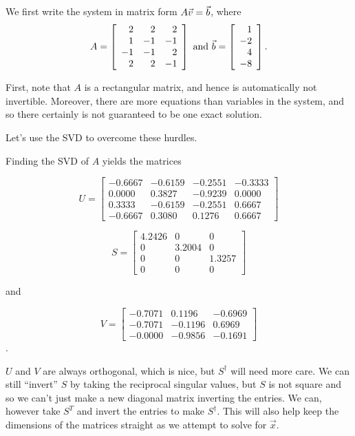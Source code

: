 \documentclass{ximera}
\begin{document}
\begin{solution}
  We first write the system in matrix form $A\vect{v}=\vect{b}$, where
  \begin{equation*}
    A = \startmat{rrr}
      2 & 2 & 2 \\
      1 & -1 & -1 \\
      -1 & -1 & 2 \\
      2 & 2 & -1 \\
    \stopmat
    \quad\mbox{and}\quad
    \vect{b} = \startmat{r} 1 \\ -2 \\ 4 \\ -8 \stopmat.
  \end{equation*}


First, note that $A$ is a rectangular matrix, and hence is automatically not invertible. Moreover, there are more equations than variables in the system, and so there certainly is not guaranteed to be one exact solution.

Let's use the SVD to overcome these hurdles. 

Finding the SVD of $A$ yields the matrices

\[
U =
\begin{bmatrix}
-0.6667 & -0.6159 & -0.2551 & -0.3333 \\
0.0000 & 0.3827 & -0.9239 & 0.0000 \\
0.3333 & -0.6159 & -0.2551 & 0.6667 \\
-0.6667 & 0.3080 & 0.1276 & 0.6667
\end{bmatrix}
\]

\[
S =
\begin{bmatrix}
4.2426 & 0      & 0 \\
0      & 3.2004 & 0 \\
0      & 0      & 1.3257 \\
0      & 0      & 0
\end{bmatrix}
\]

and

\[
V =
\begin{bmatrix}
-0.7071 & 0.1196 & -0.6969 \\
-0.7071 & -0.1196 & 0.6969 \\
-0.0000 & -0.9856 & -0.1691
\end{bmatrix}
\].

$U$ and $V$ are always orthogonal, which is nice, but $S^\dagger$ will need more care. We can still ``invert'' $S$ by taking the reciprocal singular values, but $S$ is not square and so we can't just make a new diagonal matrix inverting the entries. We can, however take $S^T$ and invert the entries to make $S^\dagger$. This will also help keep the dimensions of the matrices straight as we attempt to solve for $\vec{x}$. 


\end{solution}
\end{document}
